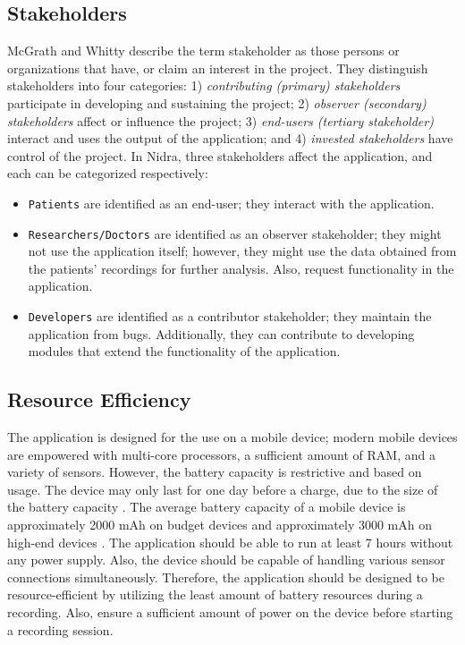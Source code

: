 \subsection{Stakeholders}
McGrath and Whitty \cite{stakeholderdefined} describe the term stakeholder as those persons or organizations that have, or claim an interest in the project. They distinguish stakeholders into four categories: 1) \textit{contributing (primary) stakeholders} participate in developing and sustaining the project; 2) \textit{observer (secondary) stakeholders} affect or influence the project;  3) \textit{end-users (tertiary stakeholder)} interact and uses the output of the application; and 4) \textit{invested stakeholders} have control of the project. In Nidra, three stakeholders affect the application, and each can be categorized respectively:
\begin{itemize}
    \item \verb|Patients| are identified as an end-user; they interact with the application.  
    \item \verb|Researchers/Doctors| are identified as an observer stakeholder; they might not use the application itself; however, they might use the data obtained from the patients' recordings for further analysis. Also, request functionality in the application.
    \item \verb|Developers| are identified as a contributor stakeholder; they maintain the application from bugs. Additionally, they can contribute to developing modules that extend the functionality of the application. 
\end{itemize}

\subsection{Resource Efficiency}
The application is designed for the use on a mobile device; modern mobile devices are empowered with multi-core processors, a sufficient amount of RAM, and a variety of sensors. However, the battery capacity is restrictive and based on usage. The device may only last for one day before a charge, due to the size of the battery capacity \cite{androidbattery}. The average battery capacity of a mobile device is approximately 2000 mAh on budget devices and approximately 3000 mAh on high-end devices \cite{androidbatteryavg}. The application should be able to run at least 7 hours without any power supply. Also, the device should be capable of handling various sensor connections simultaneously. Therefore, the application should be designed to be resource-efficient by utilizing the least amount of battery resources during a recording. Also, ensure a sufficient amount of power on the device before starting a recording session.  


